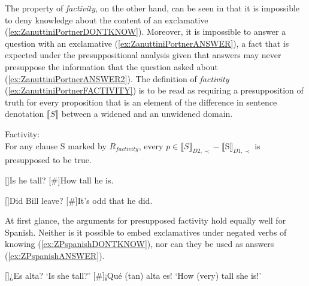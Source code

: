 The property of \textit{factivity}, on the other hand, can be seen in that it is 
impossible to deny knowledge about the content of an exclamative 
(\ref{ex:ZanuttiniPortnerDONTKNOW}). Moreover, it is impossible to answer 
a question with an exclamative (\ref{ex:ZanuttiniPortnerANSWER}), a fact 
that is expected under the presuppositional analysis given that answers 
may never presuppose the information that the question asked about (\ref{ex:ZanuttiniPortnerANSWER2}). The definition of \textit{factivity} 
(\ref{ex:ZanuttiniPortnerFACTIVITY}) is to be 
read as requiring a presupposition of truth for every proposition that is 
an element of the difference in sentence denotation $\llbracket S 
\rrbracket$ between a widened and an unwidened domain.

\begin{exe} 
	\ex \label{ex:ZanuttiniPortnerFACTIVITY} Factivity: \\
	For any clause S marked by $R_{\textit{factivity}}$, every $p \in 
	\llbracket S \rrbracket_{D2,\prec} - \llbracket $S$ 
	\rrbracket_{D1,\prec}$ is presupposed to be true.


	\ex \label{ex:ZanuttiniPortnerANSWER} 
		\begin{xlist}[A:]
			[]{Is he tall?}
			[\#]{How tall he is.}
		\end{xlist}

	\ex \label{ex:ZanuttiniPortnerANSWER2} 
		\begin{xlist}[A:]
			[]{Did Bill leave?}
			[\#]{It's odd that he did.}
		\end{xlist}
\end{exe}

At first glance, the arguments for presupposed factivity hold equally well 
for Spanish. Neither is it possible to embed exclamatives under negated 
verbs of knowing (\ref{ex:ZPspanishDONTKNOW}), nor can they be used as 
answers (\ref{ex:ZPspanishANSWER}). 

\begin{exe} 
	\ex \label{ex:ZPspanishANSWER} 
	\begin{xlist}
		[]{¿Es alta? \glt `Is she tall?'}
		[\#]{¡Qué (tan) alta es! \glt `How (very) tall she is!'}
	\end{xlist}
\end{exe}

